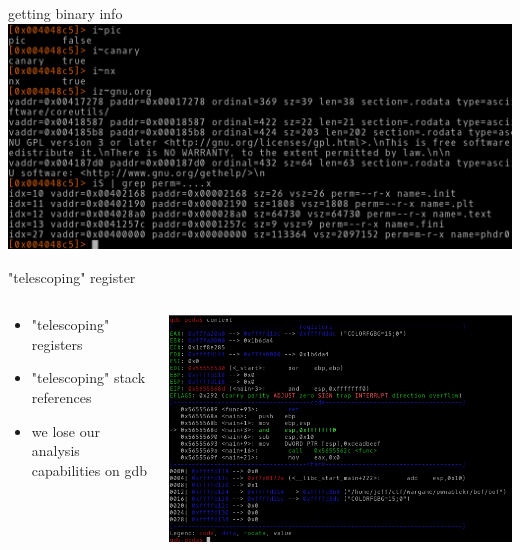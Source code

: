 \documentclass[10pt,pdf,utf8,english,compress,hyperref={unicode}]{beamer}
\begin{document}
\begin{frame}{getting binary info}
	\includegraphics[width=\textwidth]{cr_images/bin-info.png}
\end{frame}

\begin{frame}{"telescoping" register}
	\begin{columns}
		\begin{column}{.3\textwidth}
			\begin{itemize}
				\item "telescoping" registers
				\item "telescoping" stack references
				\item we lose our analysis capabilities on gdb
			\end{itemize}
		\end{column}
		\begin{column}{.7\textwidth}
			\includegraphics[width=\textwidth]{cr_images/peda_context.png}
		\end{column}
	\end{columns}
\end{frame}
\end{document}
